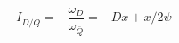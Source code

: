 \begin{equation}\label{IDQB}
 -I_{D/\bar Q}=  - \frac{\omega _{D}}{\omega _{\bar Q}}=-\bar{D}x+x/2\bar{\psi}
\end{equation}

